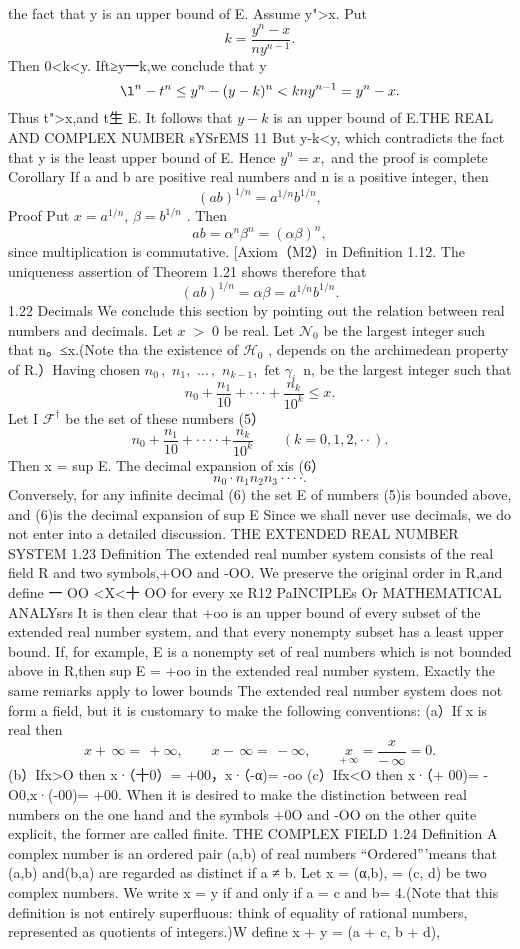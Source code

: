 the fact that y is an upper bound of E. Assume y">x. Put $$ k={\frac{y^{n}-x}{n y^{n-1}}}. $$ Then 0<k<y. Ift≥y一k,we conclude that y $$ \l_{}^{n}-t^{n}\leq y^{n}-(y-k)^{n}<k n y^{n-1}=y^{n}-x. $$ Thus t">x,and t生 E. It follows that $y-k$ is an upper bound of E.THE REAL AND COMPLEX NUMBER sYSrEMS 11 But y-k<y, which contradicts the fact that y is the least upper bound of E. Hence $y^{n}=x,$ and the proof is complete Corollary If a and b are positive real numbers and n is a positive integer, then $$ (a b)^{1/n}=a^{1/n}b^{1/n}, $$ Proof Put $x=a^{1/n},\,\beta=b^{1/n}$ . Then $$ a b=\alpha^{n}\beta^{n}=(\alpha\beta)^{n}, $$ since multiplication is commutative. [Axiom（M2）in Definition 1.12. The uniqueness assertion of Theorem 1.21 shows therefore that $$ (a b)^{1/n}=\alpha\beta=a^{1/n}b^{1/n}. $$ 1.22 Decimals We conclude this section by pointing out the relation between real numbers and decimals. Let $\scriptstyle x\;>\;0$ be real. Let ${\mathcal{N}}_{0}$ be the largest integer such that n。≤x.(Note tha the existence of ${\mathcal{H}}_{0}$ , depends on the archimedean property of R.）Having chosen $n_{0}\,,\,\,n_{1},\,\,\ldots\,,\,\,n_{k-1},\,\,\mathrm{fet}\,\,\gamma_{i}\,$ n, be the largest integer such that $$ n_{0}+{\frac{n_{1}}{10}}+\cdot\cdot\cdot+{\frac{n_{k}}{10^{k}}}\leq x. $$ Let I ${\mathcal{F}}^{\dagger}$ be the set of these numbers (5） $$ n_{0}+{\frac{n_{1}}{10}}+\cdot\cdot\cdot\cdot+{\frac{n_{k}}{10^{k}}}\qquad(k=0,1,2,\cdot\cdot). $$ Then x = sup E. The decimal expansion of xis (6） $$ n_{0}\cdot n_{1}n_{2}n_{3}\cdot\cdot\cdot\cdot. $$ Conversely, for any infinite decimal (6) the set E of numbers (5)is bounded above, and (6)is the decimal expansion of sup E Since we shall never use decimals, we do not enter into a detailed discussion. THE EXTENDED REAL NUMBER SYSTEM 1.23 Definition The extended real number system consists of the real field R and two symbols,+OO and -OO. We preserve the original order in R,and define 一 OO <X<十 OO for every xe R12 PaINCIPLEs Or MATHEMATICAL ANALYsrs It is then clear that +oo is an upper bound of every subset of the extended real number system, and that every nonempty subset has a least upper bound. If, for example, E is a nonempty set of real numbers which is not bounded above in R,then sup E = +oo in the extended real number system. Exactly the same remarks apply to lower bounds The extended real number system does not form a field, but it is customary to make the following conventions: (a）If x is real then $$ x+\,\infty=\,+\infty,\qquad x-\,\infty=\,-\infty,\qquad{\underset{+\,\infty}{x}}={\frac{x}{-\,\infty}}=0. $$ (b）Ifx>O then x·（十0）= +00，x·（-α)= -oo (c）Ifx<O then x·（+ 00)= -O0,x·(-00)= +00. When it is desired to make the distinction between real numbers on the one hand and the symbols +0O and -OO on the other quite explicit, the former are called finite. THE COMPLEX FIELD 1.24 Definition A complex number is an ordered pair (a,b) of real numbers “Ordered”’means that (a,b) and(b,a) are regarded as distinct if a ≠ b. Let x = (α,b), = (c, d) be two complex numbers. We write x = y if and only if a = c and b= 4.(Note that this definition is not entirely superfluous: think of equality of rational numbers, represented as quotients of integers.)W define x + y = (a + c, b + d), 